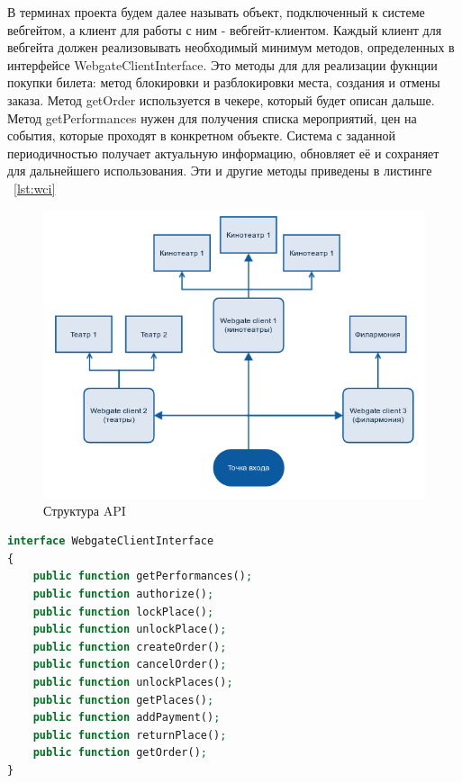 В терминах проекта будем далее называть объект, подключенный к системе вебгейтом, а клиент для работы с ним - вебгейт-клиентом. Каждый клиент для вебгейта должен реализовывать необходимый минимум методов, определенных в интерфейсе WebgateClientInterface. Это методы для для реализации фукнции покупки билета: метод блокировки и разблокировки места, создания и отмены заказа. Метод getOrder используется в чекере, который будет описан дальше. Метод getPerformances нужен для получения списка мероприятий, цен на события, которые проходят в конкретном объекте. Система с заданной периодичностью получает актуальную информацию, обновляет её и сохраняет для дальнейшего использования. Эти и другие методы приведены в листинге ~\ref{lst:wci}

\begin{figure}
  	\centering
 	\includegraphics[width=1\textwidth]{images/api-struct.png}
  	\caption{Структура API}
    \label{fig:api-struct}
\end{figure}

\begin{lstlisting}[language=PHP,caption={WebgateCleintInterface}label=lst:wci]
interface WebgateClientInterface
{
	public function getPerformances();
	public function authorize();
	public function lockPlace();
	public function unlockPlace();
	public function createOrder();
	public function cancelOrder();
	public function unlockPlaces();
	public function getPlaces();
	public function addPayment();
	public function returnPlace();
	public function getOrder();
}
\end{lstlisting}




